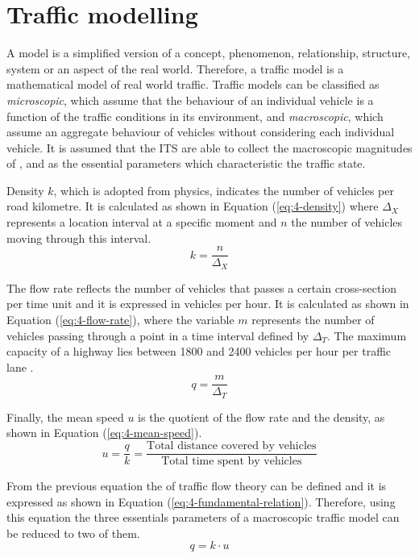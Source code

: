 \section{Traffic modelling}
A model is a simplified version of a concept, phenomenon, relationship, structure, system or an aspect of the real world. Therefore, a traffic model is a mathematical model of real world traffic. Traffic models can be classified as \textit{microscopic}, which assume that the behaviour of an individual vehicle is a function of the traffic conditions in its environment, and \textit{macroscopic}, which assume an aggregate behaviour of vehicles without considering each individual vehicle. It is assumed that the \ac{ITS} are able to collect the macroscopic magnitudes of ,  and  as the essential parameters which characteristic the traffic state. 

Density $k$, which is adopted from physics, indicates the number of vehicles per road kilometre. It is calculated as shown in Equation (\ref{eq:4-density}) where ${ \Delta  }_{ X }$ represents a location interval at a specific moment and $n$ the number of vehicles moving through this interval.
\begin{equation} \label{eq:4-density}
k = \frac { n }{ { \Delta  }_{ X } } 
\end{equation}

The flow rate reflects the number of vehicles that passes a certain cross-section per time unit and it is expressed in vehicles per hour. It is calculated as shown in Equation (\ref{eq:4-flow-rate}), where the variable $m$ represents the number of vehicles passing through a point in a time interval defined by ${ \Delta  }_{ T }$. The maximum capacity of a highway lies between 1800 and 2400 vehicles per hour per traffic lane \cite{HCM2000}.
\begin{equation} \label{eq:4-flow-rate}
q = \frac { m }{ { \Delta  }_{ T } } 
\end{equation}

Finally, the mean speed $u$ is the quotient of the flow rate and the density, as shown in Equation (\ref{eq:4-mean-speed}).
\begin{equation} \label{eq:4-mean-speed}
u = \frac { q }{ k } =\frac { \text{Total  distance  covered  by  vehicles} }{ \text{Total  time  spent  by  vehicles} } 
\end{equation}

From the previous equation the  of traffic flow theory can be defined and it is expressed as shown in Equation (\ref{eq:4-fundamental-relation}). Therefore, using this equation the three essentials parameters of a macroscopic traffic model can be reduced to two of them.
\begin{equation} \label{eq:4-fundamental-relation}
q = k \cdot u
\end{equation}

